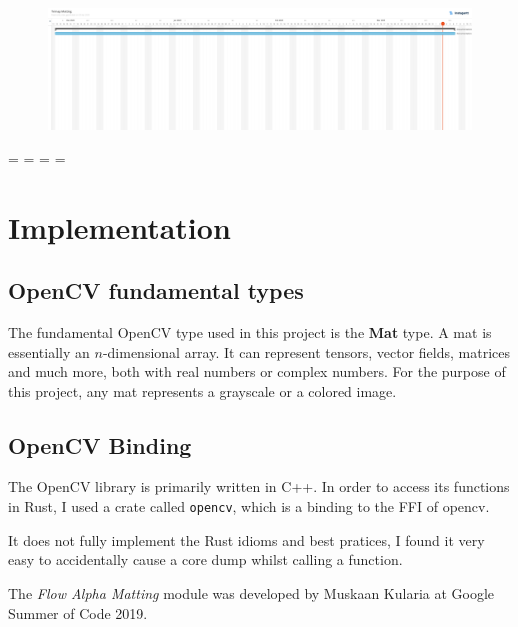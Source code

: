 \documentclass[a4paper]{article}
\begin{document}
\begin{figure}[h]
    \includegraphics[width=\textwidth]{media/gantt1.jpg}
\end{figure}


\endgroup
\newpage
\addtolength\headwidth{-1\mtL}


\paperwidth=\pdfpageheight
\paperheight=\pdfpagewidth
\pdfpageheight=\paperheight
\pdfpagewidth=\paperwidth

\section{Implementation}

\subsection{OpenCV fundamental types}

The fundamental OpenCV type used in this project is the
\textbf{Mat}\cite{mat} type. A mat is essentially an
\(n\)-dimensional array. It can represent tensors, vector fields,
matrices and much more, both with real numbers or complex numbers.
For the purpose of this project, any mat represents a grayscale
or a colored image.

\subsection{OpenCV Binding}

The OpenCV library is primarily written in C++.
In order to access its functions in Rust, I used a crate
called \texttt{opencv}\cite{rustopencv}, which is a binding
to the \gls{FFI} of opencv.

It does not fully implement the Rust idioms and best pratices,
I found it very easy to accidentally cause a core dump
whilst calling a function.

The \textit{Flow Alpha Matting} module was developed by Muskaan Kularia
at Google Summer of Code 2019.
\end{document}
